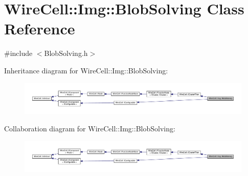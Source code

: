 \hypertarget{class_wire_cell_1_1_img_1_1_blob_solving}{}\section{Wire\+Cell\+:\+:Img\+:\+:Blob\+Solving Class Reference}
\label{class_wire_cell_1_1_img_1_1_blob_solving}


{\ttfamily \#include $<$Blob\+Solving.\+h$>$}



Inheritance diagram for Wire\+Cell\+:\+:Img\+:\+:Blob\+Solving\+:
\nopagebreak
\begin{figure}[H]
\begin{center}
\leavevmode
\includegraphics[width=350pt]{class_wire_cell_1_1_img_1_1_blob_solving__inherit__graph}
\end{center}
\end{figure}


Collaboration diagram for Wire\+Cell\+:\+:Img\+:\+:Blob\+Solving\+:
\nopagebreak
\begin{figure}[H]
\begin{center}
\leavevmode
\includegraphics[width=350pt]{class_wire_cell_1_1_img_1_1_blob_solving__coll__graph}
\end{center}
\end{figure}
